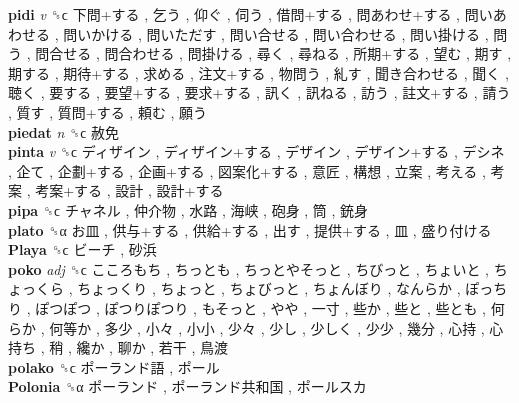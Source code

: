 \textbf{pidi} \emph{v}  ␝ϲ   下問+する ,  乞う ,  仰ぐ ,  伺う ,  借問+する ,  問あわせ+する ,  問いあわせる ,  問いかける ,  問いただす ,  問い合せる ,  問い合わせる ,  問い掛ける ,  問う ,  問合せる ,  問合わせる ,  問掛ける ,  尋く ,  尋ねる ,  所期+する ,  望む ,  期す ,  期する ,  期待+する ,  求める ,  注文+する ,  物問う ,  糺す ,  聞き合わせる ,  聞く ,  聴く ,  要する ,  要望+する ,  要求+する ,  訊く ,  訊ねる ,  訪う ,  註文+する ,  請う ,  質す ,  質問+する ,  頼む ,  願う   \\
\textbf{piedat} \emph{n}  ␝ϲ   赦免   \\
\textbf{pinta} \emph{v}  ␝ϲ   ディザイン ,  ディザイン+する ,  デザイン ,  デザイン+する ,  デシネ ,  企て ,  企劃+する ,  企画+する ,  図案化+する ,  意匠 ,  構想 ,  立案 ,  考える ,  考案 ,  考案+する ,  設計 ,  設計+する   \\
\textbf{pipa} ␝ϲ   チャネル ,  仲介物 ,  水路 ,  海峡 ,  砲身 ,  筒 ,  銃身   \\
\textbf{plato} ␝α   お皿 ,  供与+する ,  供給+する ,  出す ,  提供+する ,  皿 ,  盛り付ける   \\
\textbf{Playa} ␝ϲ   ビーチ ,  砂浜   \\
\textbf{poko} \emph{adj}  ␝ϲ   こころもち ,  ちっとも ,  ちっとやそっと ,  ちびっと ,  ちょいと ,  ちょっくら ,  ちょっくり ,  ちょっと ,  ちょびっと ,  ちょんぼり ,  なんらか ,  ぽっちり ,  ぽつぽつ ,  ぽつりぽつり ,  もそっと ,  やや ,  一寸 ,  些か ,  些と ,  些とも ,  何らか ,  何等か ,  多少 ,  小々 ,  小小 ,  少々 ,  少し ,  少しく ,  少少 ,  幾分 ,  心持 ,  心持ち ,  稍 ,  纔か ,  聊か ,  若干 ,  鳥渡   \\
\textbf{polako} ␝ϲ   ポーランド語 ,  ポール   \\
\textbf{Polonia} ␝α   ポーランド ,  ポーランド共和国 ,  ポールスカ   \\
